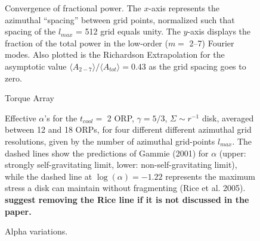 \documentclass[manuscript]{aastex}
\begin{document}
\begin{figure}
\caption
{
Convergence of fractional power.  The $x$-axis represents
the azimuthal ``spacing'' between grid points,  normalized such that spacing of the $l_{max}$ = 512 grid
equals unity.
The $y$-axis displays the fraction of the total power in the low-order ($m = $ 2--7) Fourier modes. 
Also plotted is the Richardson Extrapolation for the asymptotic value  
$\langle A_{2-7} \rangle / \langle A_{tot} \rangle = 0.43$ as the grid spacing goes to zero.  
}
\label{fig:Power_Extrap}
\end{figure}

\begin{figure}
\caption
{
Torque Array}
\label{fig:torquearray}
\end{figure}


\begin{figure}
\caption
{Effective $\alpha$'s for the $t_{cool} =$ 2 ORP, $\gamma = 5/3$, $\Sigma \sim r^{ -1}$ disk, averaged between 12 and 18 ORPs, for four different different azimuthal grid resolutions, given by the number of azimuthal grid-points $l_{max}$. The dashed lines show the predictions of Gammie (2001) for $\alpha$ (upper: strongly self-gravitating limit, lower: non-self-gravitating limit), while the dashed line at $\log(\alpha) = -1.22$ represents the maximum stress a disk can maintain without fragmenting (Rice et al. 2005). {\bf suggest removing the Rice line if it is not discussed in the paper.} 
}
\label{fig:alpha_v_radius}
\end{figure}
\newpage

\begin{figure}
\caption
{Alpha variations.}
\label{fig:alphavar}
\end{figure}
\end{document}
